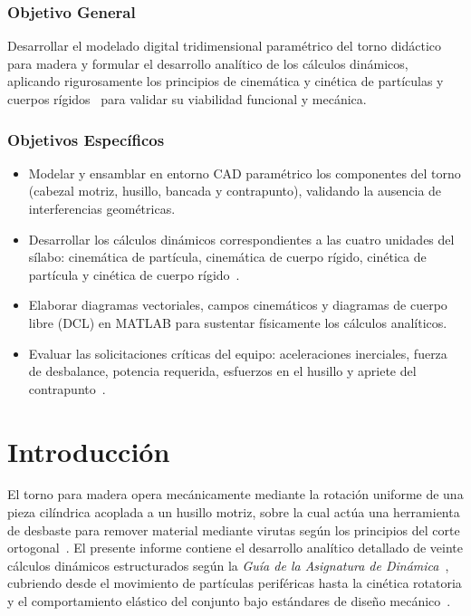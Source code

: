 \documentclass[12pt,a4paper]{article}
\begin{document}
\subsubsection{Objetivo General}
Desarrollar el modelado digital tridimensional paramétrico del torno didáctico para madera y formular el desarrollo analítico de los cálculos dinámicos, aplicando rigurosamente los principios de cinemática y cinética de partículas y cuerpos rígidos~\cite{guia_dinamica, hibbeler2016, shabana2013, nikravesh1988} para validar su viabilidad funcional y mecánica.

\subsubsection{Objetivos Específicos}
\begin{itemize}[leftmargin=18pt, itemsep=4pt, parsep=2pt]
    \item Modelar y ensamblar en entorno CAD paramétrico los componentes del torno (cabezal motriz, husillo, bancada y contrapunto), validando la ausencia de interferencias geométricas.
    \item Desarrollar los cálculos dinámicos correspondientes a las cuatro unidades del sílabo: cinemática de partícula, cinemática de cuerpo rígido, cinética de partícula y cinética de cuerpo rígido~\cite{guia_dinamica, beer2017, meriam2015}.
    \item Elaborar diagramas vectoriales, campos cinemáticos y diagramas de cuerpo libre (DCL) en MATLAB para sustentar físicamente los cálculos analíticos.
    \item Evaluar las solicitaciones críticas del equipo: aceleraciones inerciales, fuerza de desbalance, potencia requerida, esfuerzos en el husillo y apriete del contrapunto~\cite{shigley2015, norton2013, groover2007}.
\end{itemize}

\section{Introducción}
El torno para madera opera mecánicamente mediante la rotación uniforme de una pieza cilíndrica acoplada a un husillo motriz, sobre la cual actúa una herramienta de desbaste para remover material mediante virutas según los principios del corte ortogonal~\cite{groover2007, kalpakjian2014, altintas2012, boothroyd2006}. El presente informe contiene el desarrollo analítico detallado de veinte cálculos dinámicos estructurados según la \textit{Guía de la Asignatura de Dinámica}~\cite{guia_dinamica}, cubriendo desde el movimiento de partículas periféricas hasta la cinética rotatoria y el comportamiento elástico del conjunto bajo estándares de diseño mecánico~\cite{shigley2015, urinov2024}.
\end{document}
